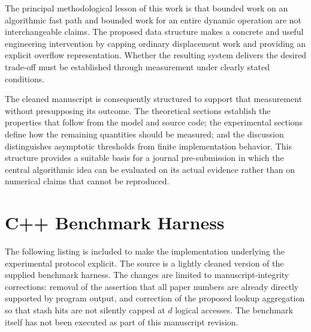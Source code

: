 \documentclass[conference]{IEEEtran}
\begin{document}
The principal methodological lesson of this work is that bounded work on an algorithmic fast path and bounded work for an entire dynamic operation are not interchangeable claims. The proposed data structure makes a concrete and useful engineering intervention by capping ordinary displacement work and providing an explicit overflow representation. Whether the resulting system delivers the desired trade-off must be established through measurement under clearly stated conditions.

The cleaned manuscript is consequently structured to support that measurement without presupposing its outcome. The theoretical sections establish the properties that follow from the model and source code; the experimental sections define how the remaining quantities should be measured; and the discussion distinguishes asymptotic thresholds from finite implementation behavior. This structure provides a suitable basis for a journal pre-submission in which the central algorithmic idea can be evaluated on its actual evidence rather than on numerical claims that cannot be reproduced.


\appendices
\section{C++ Benchmark Harness}

The following listing is included to make the implementation underlying the experimental protocol explicit. The source is a lightly cleaned version of the supplied benchmark harness. The changes are limited to manuscript-integrity corrections: removal of the assertion that all paper numbers are already directly supported by program output, and correction of the proposed lookup aggregation so that stash hits are not silently capped at $d$ logical accesses. The benchmark itself has not been executed as part of this manuscript revision.





\end{document}

